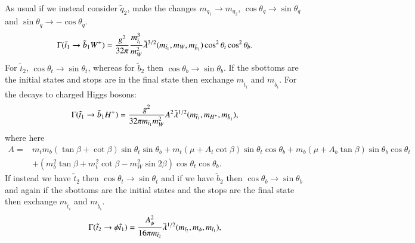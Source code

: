 \documentclass[final,3p,times]{elsarticle}
\begin{document}
As usual if we instead consider $\tilde{q}_2$, make the changes $m_{q_1} \rightarrow m_{q_2}$, $\cos\theta_q \rightarrow \sin\theta_q$ and $\sin\theta_q \rightarrow -\cos\theta_q$.
\begin{equation}\label{t1b1W}
\begin{aligned}
\Gamma (\tilde{t}_1 \rightarrow \tilde{b}_1 W^+ ) = {g^2 \over 32\pi} {m_{\tilde{t}_1}^3 \over m_{W}^2} {\tilde{\lambda}^{3/2}}(m_{\tilde{t}_1},m_W,m_{\tilde{b}_1}) \cos^2\theta_t \cos^2\theta_b.
\end{aligned}
\end{equation} 
For $\tilde{t}_2$, $\cos\theta_t \rightarrow \sin\theta_t$, whereas for
$\tilde{b}_2$ then $\cos\theta_b \rightarrow \sin\theta_b$. 
If the sbottoms are the initial states and stops are in the final state then
exchange $m_{\tilde{t}_i}$ and $m_{\tilde{b}_i}$. 
For the decays to charged Higgs bosons:
\begin{equation}\label{t1b1Hpm}
\begin{aligned}
\Gamma (\tilde{t}_1 \rightarrow \tilde{b}_1 H^+ ) = {g^2 \over 32\pi m_{\tilde{t}_1} m_{W}^{2}} A^2 \tilde{\lambda}^{1/2} ( m_{\tilde{t}_1}, m_{H^+}, m_{\tilde{b}_1} ),
\end{aligned}
\end{equation} 
where here
\begin{equation}
\begin{aligned}
A = & m_t m_b (\tan\beta + \cot\beta)\sin\theta_t\sin\theta_b +  m_t(\mu + A_t \cot\beta)\sin\theta_t\cos\theta_b + m_b(\mu + A_b \tan\beta)\sin\theta_b\cos\theta_t \\ &  + (m_b^2 \tan\beta + m_t^2 \cot\beta - m_W^2 \sin2 \beta) \cos\theta_t\cos\theta_b.
\end{aligned}
\end{equation}
If instead we have $\tilde{t}_2$ then $\cos\theta_t \rightarrow \sin\theta_t$ and if we have $\tilde{b}_2$ then $\cos\theta_b \rightarrow \sin\theta_b$ and again if the sbottoms are the initial states and the stops are the final state then exchange $m_{\tilde{t}_i}$ and $m_{\tilde{b}_i}$.
\begin{equation}\label{t2t1phi}
\begin{aligned}
\Gamma (\tilde{t}_2 \rightarrow \phi \tilde{t}_1) = {A_{\phi}^2 \over 16\pi m_{\tilde{t}_2} } \tilde{\lambda}^{1/2} (m_{\tilde{t}_2}, m_\phi, m_{\tilde{t}_1}),
\end{aligned}
\end{equation} 
\end{document}
